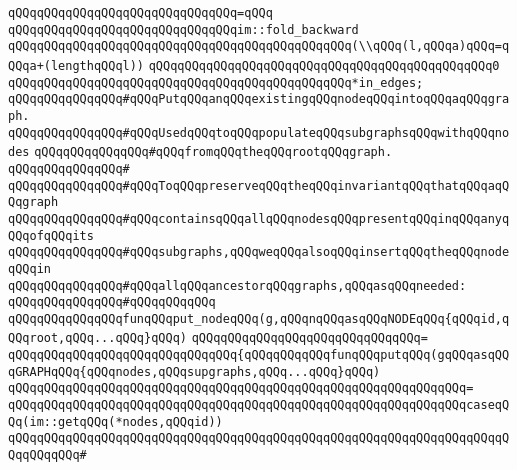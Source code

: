 \verb|qQQqqQQqqQQqqQQqqQQqqQQqqQQqqQQq=qQQq|\newline
\verb|qQQqqQQqqQQqqQQqqQQqqQQqqQQqqQQqim::fold_backward|\newline
\verb|qQQqqQQqqQQqqQQqqQQqqQQqqQQqqQQqqQQqqQQqqQQqqQQq(\\qQQq(l,qQQqa)qQQq=qQQqa+(lengthqQQql))|\newline
\verb|qQQqqQQqqQQqqQQqqQQqqQQqqQQqqQQqqQQqqQQqqQQqqQQq0|\newline
\verb|qQQqqQQqqQQqqQQqqQQqqQQqqQQqqQQqqQQqqQQqqQQqqQQq*in_edges;|\newline
\newline
\newline
\newline
\verb|qQQqqQQqqQQqqQQq#qQQqPutqQQqanqQQqexistingqQQqnodeqQQqintoqQQqaqQQqgraph.|\newline
\verb|qQQqqQQqqQQqqQQq#qQQqUsedqQQqtoqQQqpopulateqQQqsubgraphsqQQqwithqQQqnodes|\newline
\verb|qQQqqQQqqQQqqQQq#qQQqfromqQQqtheqQQqrootqQQqgraph.|\newline
\verb|qQQqqQQqqQQqqQQq#|\newline
\verb|qQQqqQQqqQQqqQQq#qQQqToqQQqpreserveqQQqtheqQQqinvariantqQQqthatqQQqaqQQqgraph|\newline
\verb|qQQqqQQqqQQqqQQq#qQQqcontainsqQQqallqQQqnodesqQQqpresentqQQqinqQQqanyqQQqofqQQqits|\newline
\verb|qQQqqQQqqQQqqQQq#qQQqsubgraphs,qQQqweqQQqalsoqQQqinsertqQQqtheqQQqnodeqQQqin|\newline
\verb|qQQqqQQqqQQqqQQq#qQQqallqQQqancestorqQQqgraphs,qQQqasqQQqneeded:|\newline
\verb|qQQqqQQqqQQqqQQq#qQQqqQQqqQQq|\newline
\verb|qQQqqQQqqQQqqQQqfunqQQqput_nodeqQQq(g,qQQqnqQQqasqQQqNODEqQQq{qQQqid,qQQqroot,qQQq...qQQq}qQQq)|\newline
\verb|qQQqqQQqqQQqqQQqqQQqqQQqqQQqqQQq=|\newline
\verb|qQQqqQQqqQQqqQQqqQQqqQQqqQQqqQQq{qQQqqQQqqQQqfunqQQqputqQQq(gqQQqasqQQqGRAPHqQQq{qQQqnodes,qQQqsupgraphs,qQQq...qQQq}qQQq)|\newline
\verb|qQQqqQQqqQQqqQQqqQQqqQQqqQQqqQQqqQQqqQQqqQQqqQQqqQQqqQQqqQQqqQQq=|\newline
\verb|qQQqqQQqqQQqqQQqqQQqqQQqqQQqqQQqqQQqqQQqqQQqqQQqqQQqqQQqqQQqqQQqcaseqQQq(im::getqQQq(*nodes,qQQqid))|\newline
\verb|qQQqqQQqqQQqqQQqqQQqqQQqqQQqqQQqqQQqqQQqqQQqqQQqqQQqqQQqqQQqqQQqqQQqqQQqqQQqqQQq#|\newline
